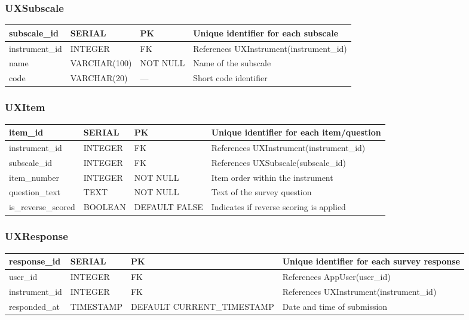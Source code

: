 \documentclass[11pt]{article}
\begin{document}
\subsubsection*{UXSubscale}
\begin{tabularx}{\linewidth}{|l|l|l|X|}
\hline
subscale\_id & SERIAL & PK & Unique identifier for each subscale \\
\hline
instrument\_id & INTEGER & FK & References UXInstrument(instrument\_id) \\
\hline
name & VARCHAR(100) & NOT NULL & Name of the subscale \\
\hline
code & VARCHAR(20) & --- & Short code identifier \\
\hline
\end{tabularx}

\subsubsection*{UXItem}
\begin{tabularx}{\linewidth}{|l|l|l|X|}
\hline
item\_id & SERIAL & PK & Unique identifier for each item/question \\
\hline
instrument\_id & INTEGER & FK & References UXInstrument(instrument\_id) \\
\hline
subscale\_id & INTEGER & FK & References UXSubscale(subscale\_id) \\
\hline
item\_number & INTEGER & NOT NULL & Item order within the instrument \\
\hline
question\_text & TEXT & NOT NULL & Text of the survey question \\
\hline
is\_reverse\_scored & BOOLEAN & DEFAULT FALSE & Indicates if reverse scoring is applied \\
\hline
\end{tabularx}

\subsubsection*{UXResponse}
\begin{tabularx}{\linewidth}{|l|l|l|X|}
\hline
response\_id & SERIAL & PK & Unique identifier for each survey response \\
\hline
user\_id & INTEGER & FK & References AppUser(user\_id) \\
\hline
instrument\_id & INTEGER & FK & References UXInstrument(instrument\_id) \\
\hline
responded\_at & TIMESTAMP & DEFAULT CURRENT\_TIMESTAMP & Date and time of submission \\
\hline
\end{tabularx}
\end{document}
